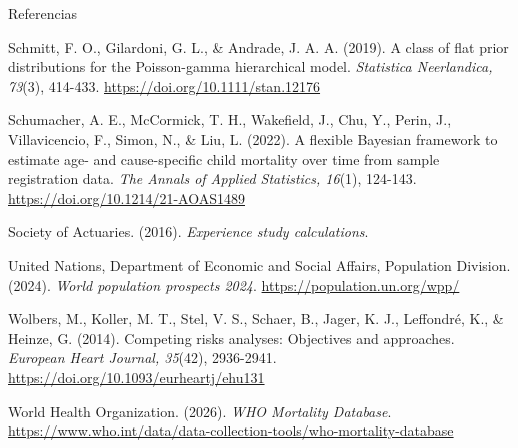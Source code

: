 \documentclass[12pt,aspectratio=169]{beamer}
\newcommand{\aparef}[1]{%
  \par\begingroup
  \leftskip=5mm
  \noindent\hspace*{-5mm}#1\par
  \endgroup\vspace{0.16mm}%
}
\begin{document}
\begin{frame}[t,noframenumbering]{Referencias}
\begin{list}{}
  \aparef{Schmitt, F. O., Gilardoni, G. L., \& Andrade, J. A. A. (2019). A class of flat prior distributions for the Poisson-gamma hierarchical model. \textit{Statistica Neerlandica, 73}(3), 414-433. \url{https://doi.org/10.1111/stan.12176}}
  \aparef{Schumacher, A. E., McCormick, T. H., Wakefield, J., Chu, Y., Perin, J., Villavicencio, F., Simon, N., \& Liu, L. (2022). A flexible Bayesian framework to estimate age- and cause-specific child mortality over time from sample registration data. \textit{The Annals of Applied Statistics, 16}(1), 124-143. \url{https://doi.org/10.1214/21-AOAS1489}}
  \aparef{Society of Actuaries. (2016). \textit{Experience study calculations}.}
  \aparef{United Nations, Department of Economic and Social Affairs, Population Division. (2024). \textit{World population prospects 2024}. \url{https://population.un.org/wpp/}}
  \aparef{Wolbers, M., Koller, M. T., Stel, V. S., Schaer, B., Jager, K. J., Leffondré, K., \& Heinze, G. (2014). Competing risks analyses: Objectives and approaches. \textit{European Heart Journal, 35}(42), 2936-2941. \url{https://doi.org/10.1093/eurheartj/ehu131}}
  \aparef{World Health Organization. (2026). \textit{WHO Mortality Database}. \url{https://www.who.int/data/data-collection-tools/who-mortality-database}}
  \end{list}
  \endgroup
\end{frame}
\end{document}
